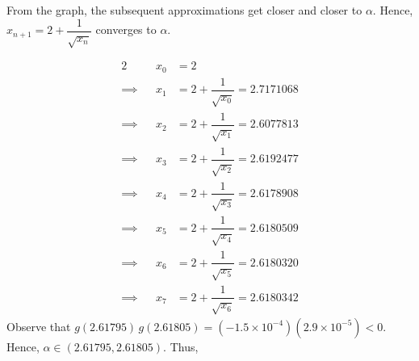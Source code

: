 \documentclass{echw}
\begin{document}
\begin{center}
                \end{center}

                \noindent From the graph, the subsequent approximations get closer and closer to $\alpha$. Hence, $x_{n+1} = 2 + \dfrac1{\sqrt{x_n}}$ converges to $\alpha$.
                \medskip

            \subpart
                \begin{alignat*}{2}
                    &&x_0 &= 2\\
                    \implies&&x_1 &= 2 + \dfrac1{\sqrt{x_0}} = 2.7171068\\
                    \implies&&x_2 &= 2 + \dfrac1{\sqrt{x_1}} = 2.6077813\\
                    \implies&&x_3 &= 2 + \dfrac1{\sqrt{x_2}} = 2.6192477\\
                    \implies&&x_4 &= 2 + \dfrac1{\sqrt{x_3}} = 2.6178908\\
                    \implies&&x_5 &= 2 + \dfrac1{\sqrt{x_4}} = 2.6180509\\
                    \implies&&x_6 &= 2 + \dfrac1{\sqrt{x_5}} = 2.6180320\\
                    \implies&&x_7 &= 2 + \dfrac1{\sqrt{x_6}} = 2.6180342
                \end{alignat*}
                Observe that $g(2.61795)\,g(2.61805) = (-1.5 \times 10^{-4})(2.9 \times 10^{-5}) < 0$. Hence, $\alpha \in (2.61795, 2.61805)$. Thus,
\end{document}
